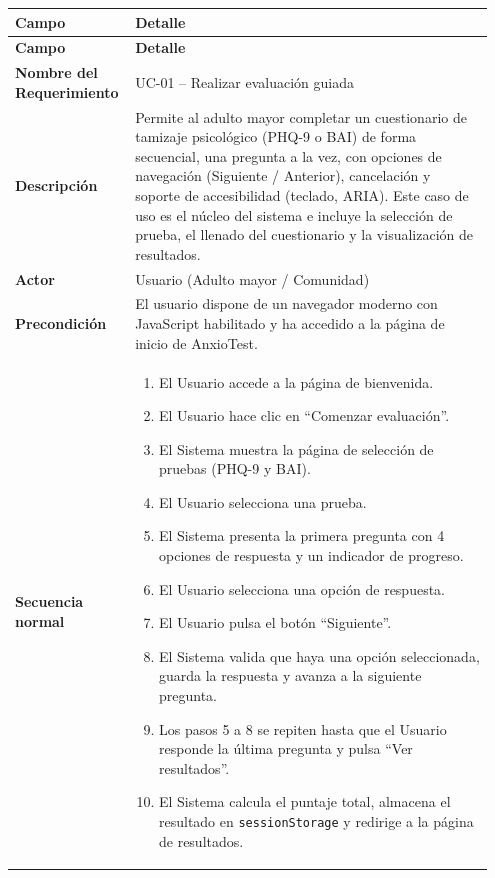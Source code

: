 \begin{longtable}{p{0.22\linewidth} p{0.73\linewidth}}
\toprule
\rowcolor{tableheader!20}
\textbf{Campo} & \textbf{Detalle} \\
\midrule
\endfirsthead
\rowcolor{tableheader!20}
\textbf{Campo} & \textbf{Detalle} \\
\midrule
\endhead
\bottomrule
\endfoot
\textbf{Nombre del Requerimiento} & UC-01 -- Realizar evaluación guiada \\
\textbf{Descripción} & Permite al adulto mayor completar un cuestionario de tamizaje psicológico (PHQ-9 o BAI) de forma secuencial, una pregunta a la vez, con opciones de navegación (Siguiente / Anterior), cancelación y soporte de accesibilidad (teclado, ARIA). Este caso de uso es el núcleo del sistema e incluye la selección de prueba, el llenado del cuestionario y la visualización de resultados. \\
\textbf{Actor} & Usuario (Adulto mayor / Comunidad) \\
\textbf{Precondición} & El usuario dispone de un navegador moderno con JavaScript habilitado y ha accedido a la página de inicio de AnxioTest. \\
\textbf{Secuencia normal} & 
  \begin{enumerate}
    \item El Usuario accede a la página de bienvenida.
    \item El Usuario hace clic en ``Comenzar evaluación''.
    \item El Sistema muestra la página de selección de pruebas (PHQ-9 y BAI).
    \item El Usuario selecciona una prueba.
    \item El Sistema presenta la primera pregunta con 4 opciones de respuesta y un indicador de progreso.
    \item El Usuario selecciona una opción de respuesta.
    \item El Usuario pulsa el botón ``Siguiente''.
    \item El Sistema valida que haya una opción seleccionada, guarda la respuesta y avanza a la siguiente pregunta.
    \item Los pasos 5 a 8 se repiten hasta que el Usuario responde la última pregunta y pulsa ``Ver resultados''.
    \item El Sistema calcula el puntaje total, almacena el resultado en \texttt{sessionStorage} y redirige a la página de resultados.
  \end{enumerate} \\

\end{longtable}
